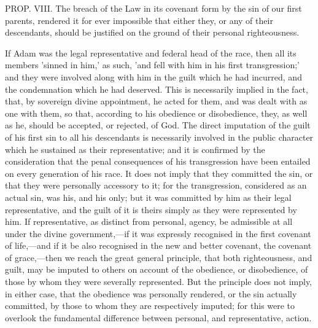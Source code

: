 \documentclass[
]{book}
\begin{document}
PROP. VIII. The breach of the Law in its covenant form by the sin of our first parents, rendered it for ever impossible that either they, or any of their descendants, should be justified on the ground of their personal righteousness.

If Adam was the legal representative and federal head of the race, then all its members 'sinned in him,' as such, 'and fell with him in his first transgression;' and they were involved along with him in the guilt which he had incurred, and the condemnation which he had deserved. This is necessarily implied in the fact, that, by sovereign divine appointment, he acted for them, and was dealt with as one with them, so that, according to his obedience or disobedience, they, as well as he, should be accepted, or rejected, of God. The direct imputation of the guilt of his first sin to all his descendants is necessarily involved in the public character which he sustained as their representative; and it is confirmed by the consideration that the penal consequences of his transgression have been entailed on every generation of his race. It does not imply that they committed the sin, or that they were personally accessory to it; for the transgression, considered as an actual sin, was his, and his only; but it was committed by him as their legal representative, and the guilt of it is theirs simply as they were represented by him. If representative, as distinct from personal, agency, be admissible at all under the divine government,---if it was expressly recognised in the first covenant of life,---and if it be also recognised in the new and better covenant, the covenant of grace,---then we reach the great general principle, that both righteousness, and guilt, may be imputed to others on account of the obedience, or disobedience, of those by whom they were severally represented. But the principle does not imply, in either case, that the obedience was personally rendered, or the sin actually committed, by those to whom they are respectively imputed; for this were to overlook the fundamental difference between personal, and representative, action.
\end{document}

